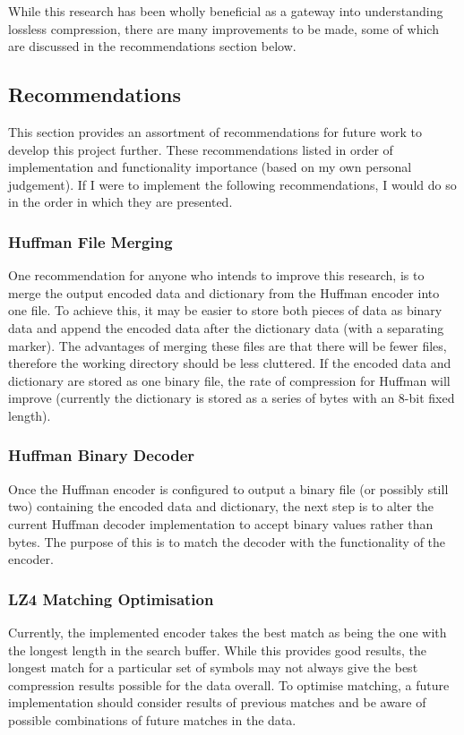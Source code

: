 \documentclass[12pt]{article}
\begin{document}
While this research has been wholly beneficial as a gateway into understanding lossless compression, there are many improvements to be made, some of which are discussed in the recommendations section below.

\subsection{Recommendations}
This section provides an assortment of recommendations for future work to develop this project further. These recommendations listed in order of implementation and functionality importance (based on my own personal judgement). If I were to implement the following recommendations, I would do so in the order in which they are presented.

\subsubsection{Huffman File Merging}
One recommendation for anyone who intends to improve this research, is to merge the output encoded data and dictionary from the Huffman encoder into one file. To achieve this, it may be easier to store both pieces of data as binary data and append the encoded data after the dictionary data (with a separating marker). The advantages of merging these files are that there will be fewer files, therefore the working directory should be less cluttered. If the encoded data and dictionary are stored as one binary file, the rate of compression for Huffman will improve (currently the dictionary is stored as a series of bytes with an 8-bit fixed length).

\subsubsection{Huffman Binary Decoder}
Once the Huffman encoder is configured to output a binary file (or possibly still two) containing the encoded data and dictionary, the next step is to alter the current Huffman decoder implementation to accept binary values rather than bytes. The purpose of this is to match the decoder with the functionality of the encoder.

\subsubsection{LZ4 Matching Optimisation}
Currently, the implemented encoder takes the best match as being the one with the longest length in the search buffer. While this provides good results, the longest match for a particular set of symbols may not always give the best compression results possible for the data overall. To optimise matching, a future implementation should consider results of previous matches and be aware of possible combinations of future matches in the data. 
\end{document}
